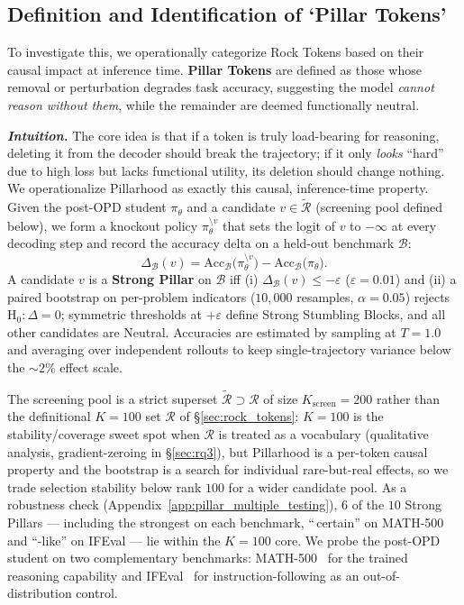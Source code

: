 





\subsection{Definition and Identification of `Pillar Tokens'}
\label{sec:pillar-identification}

To investigate this, we operationally categorize Rock Tokens based on their causal impact at inference time. \textbf{Pillar Tokens} are defined as those whose removal or perturbation degrades task accuracy, suggesting the model \emph{cannot reason without them}, while the remainder are deemed functionally neutral. 

\emph{\textbf{Intuition.}} The core idea is that if a token is truly load-bearing for reasoning, deleting it from the decoder should break the trajectory; if it only \emph{looks} ``hard'' due to high loss but lacks functional utility, its deletion should change nothing. We operationalize Pillarhood as exactly this causal, inference-time property. Given the post-OPD student $\pi_\theta$ and a candidate $v\in\widetilde{\mathcal{R}}$ (screening pool defined below), we form a knockout policy $\pi_\theta^{\setminus v}$ that sets the logit of $v$ to $-\infty$ at every decoding step and record the accuracy delta on a held-out benchmark $\mathcal{B}$:
\begin{equation}
\Delta_{\mathcal{B}}(v) = \mathrm{Acc}_{\mathcal{B}}\bigl(\pi_\theta^{\setminus v}\bigr) - \mathrm{Acc}_{\mathcal{B}}\bigl(\pi_\theta\bigr).
\label{eq:pillar-delta}
\end{equation}
A candidate $v$ is a \textbf{Strong Pillar} on $\mathcal{B}$ iff (i) $\Delta_\mathcal{B}(v)\le-\varepsilon$ ($\varepsilon=0.01$) and (ii) a paired bootstrap on per-problem indicators ($10{,}000$ resamples, $\alpha=0.05$) rejects $\mathrm{H}_0\!:\!\Delta=0$; symmetric thresholds at $+\varepsilon$ define Strong Stumbling Blocks, and all other candidates are Neutral. Accuracies are estimated by sampling at $T{=}1.0$ and averaging over independent rollouts to keep single-trajectory variance below the $\sim\!2\%$ effect scale.

The screening pool is a strict superset $\widetilde{\mathcal{R}}\supset\mathcal{R}$ of size $K_{\text{screen}}=200$ rather than the definitional $K=100$ set $\mathcal{R}$ of \S\ref{sec:rock_tokens}: $K=100$ is the stability/coverage sweet spot when $\mathcal{R}$ is treated as a vocabulary (qualitative analysis, gradient-zeroing in \S\ref{sec:rq3}), but Pillarhood is a per-token causal property and the bootstrap is a search for individual rare-but-real effects, so we trade selection stability below rank $100$ for a wider candidate pool. As a robustness check (Appendix~\ref{app:pillar_multiple_testing}), $6$ of the $10$ Strong Pillars --- including the strongest on each benchmark, ``\,certain'' on MATH-500 and ``-like'' on IFEval --- lie within the $K=100$ core. We probe the post-OPD student on two complementary benchmarks: MATH-500~\cite{lightman2023letsverifystepstep} for the trained reasoning capability and IFEval~\cite{zhou2023instruction} for instruction-following as an out-of-distribution control.


